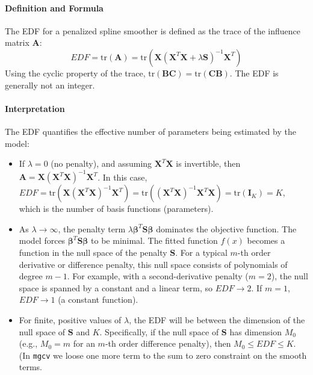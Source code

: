 \documentclass[11pt, a4paper]{article}
\begin{document}
\paragraph{Definition and Formula}
The EDF for a penalized spline smoother is defined as the trace of the influence matrix $\mathbf{A}$:
\[ EDF = \text{tr}(\mathbf{A}) = \text{tr}(\mathbf{X}(\mathbf{X}^T\mathbf{X} + \lambda\mathbf{S})^{-1}\mathbf{X}^T) \]
Using the cyclic property of the trace, $\text{tr}(\mathbf{B}\mathbf{C}) = \text{tr}(\mathbf{C}\mathbf{B})$. The EDF is generally not an integer.

\paragraph{Interpretation}
The EDF quantifies the effective number of parameters being estimated by the model:
\begin{itemize}
 \item If $\lambda = 0$ (no penalty), and assuming $\mathbf{X}^T\mathbf{X}$ is invertible, then $\mathbf{A} = \mathbf{X}(\mathbf{X}^T\mathbf{X})^{-1}\mathbf{X}^T$. In this case, $EDF = \text{tr}(\mathbf{X}(\mathbf{X}^T\mathbf{X})^{-1}\mathbf{X}^T) = \text{tr}((\mathbf{X}^T\mathbf{X})^{-1}\mathbf{X}^T\mathbf{X}) = \text{tr}(\mathbf{I}_K) = K$, which is the number of basis functions (parameters).
 \item As $\lambda \rightarrow \infty$, the penalty term $\lambda \boldsymbol{\beta}^T \mathbf{S} \boldsymbol{\beta}$ dominates the objective function. The model forces $\boldsymbol{\beta}^T \mathbf{S} \boldsymbol{\beta}$ to be minimal. The fitted function $f(x)$ becomes a function in the null space of the penalty $\mathbf{S}$. For a typical $m$-th order derivative or difference penalty, this null space consists of polynomials of degree $m-1$. For example, with a second-derivative penalty ($m=2$), the null space is spanned by a constant and a linear term, so $EDF \rightarrow 2$. If $m=1$, $EDF \rightarrow 1$ (a constant function).
 \item For finite, positive values of $\lambda$, the EDF will be between the dimension of the null space of $\mathbf{S}$ and $K$. Specifically, if the null space of $\mathbf{S}$ has dimension $M_0$ (e.g., $M_0=m$ for an $m$-th order difference penalty), then $M_0 \le EDF \le K$. (In \verb|mgcv| we loose one more term to the sum to zero constraint on the smooth terms.
\end{itemize}
\end{document}
